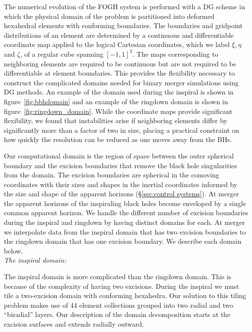 \documentclass[12pt]{caltech_thesis}
\begin{document}
\begin{bibunit}[unsrtnat]
The numerical evolution of the FOGH system is performed with a DG scheme in which
the physical domain of the problem is partitioned into deformed hexahedral
elements with conforming boundaries. The boundaries and gridpoint distributions
of an element are determined by a continuous and differentiable coordinate map
applied to the logical Cartesian coordinates, which we label $\xi, \eta$ and
$\zeta$, of a regular cube spanning $[-1,1]^3$. The maps corresponding to
neighboring elements are required to be continuous but are not required to be
differentiable at
element boundaries. This provides the flexibility necessary to construct the
complicated domains needed for binary merger simulations using DG methods. An
example of the domain used during the inspiral is shown in
figure~\ref{fig:bbhdomain} and an example of the ringdown domain is shown in
figure~\ref{fig:ringdown_domain}. While the coordinate maps provide
significant flexibility, we found that instabilities arise if neighboring
elements differ by significantly more than a factor of two in size, placing a
practical constraint on how quickly the resolution can be reduced as one moves
away from the BHs.

Our computational domain is the region of space between the outer spherical
boundary and the excision boundaries that remove the black hole singularities
from the domain. The excision boundaries are spherical in the comoving
coordinates with their sizes and shapes in the inertial coordinates informed by
the size and shape of the apparent horizons (\S\ref{sec:control systems}). At
merger the apparent horizons of
the inspiraling black holes become enveloped by a single common apparent
horizon.  We handle the different number of excision boundaries during the
inspiral and ringdown by having distinct domains for each. At merger we
interpolate data from the inspiral domain that has two excision boundaries to
the ringdown domain that has one excision boundary.  We describe each domain
below.
\\

\noindent\textit{The inspiral domain:}

The inspiral domain is more complicated than the ringdown domain. This is
because of the complexity of having two excisions. During the
inspiral we must tile a two-excision domain with conforming hexahedra. Our
solution to this tiling problem makes use of 44 element collections grouped
into two radial and two ``biradial'' layers. Our description of the domain
decomposition starts at the excision surfaces and extends radially outward.


\end{bibunit}
\end{document}
